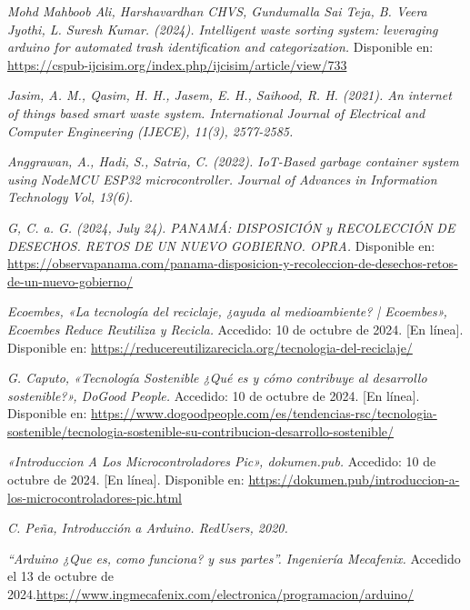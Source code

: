 \begin{thebibliography}{99}

    \textit{Mohd Mahboob Ali, Harshavardhan CHVS, Gundumalla Sai Teja, B. Veera Jyothi,  L. Suresh Kumar. (2024). Intelligent waste sorting system: leveraging arduino for automated trash identification and categorization.} Disponible en: \url{https://cspub-ijcisim.org/index.php/ijcisim/article/view/733}

    \textit{Jasim, A. M., Qasim, H. H., Jasem, E. H., Saihood, R. H. (2021). An internet of things based smart waste system. International Journal of Electrical and Computer Engineering (IJECE), 11(3), 2577-2585.}

    \textit{Anggrawan, A., Hadi, S., Satria, C. (2022). IoT-Based garbage container system using NodeMCU ESP32 microcontroller. Journal of Advances in Information Technology Vol, 13(6).}

    \textit{G, C. a. G. (2024, July 24). PANAMÁ: DISPOSICIÓN y RECOLECCIÓN DE DESECHOS. RETOS DE UN NUEVO GOBIERNO. OPRA. } Disponible en: \url{https://observapanama.com/panama-disposicion-y-recoleccion-de-desechos-retos-de-un-nuevo-gobierno/}

    \textit{Ecoembes, «La tecnología del reciclaje, ¿ayuda al medioambiente? | Ecoembes», Ecoembes Reduce Reutiliza y Recicla.} Accedido: 10 de octubre de 2024. [En línea]. Disponible en: \url{https://reducereutilizarecicla.org/tecnologia-del-reciclaje/}
    
    \textit{G. Caputo, «Tecnología Sostenible ¿Qué es y cómo contribuye al desarrollo sostenible?», DoGood People.} Accedido: 10 de octubre de 2024. [En línea]. Disponible en: \url{https://www.dogoodpeople.com/es/tendencias-rsc/tecnologia-sostenible/tecnologia-sostenible-su-contribucion-desarrollo-sostenible/}
    
    \textit{«Introduccion A Los Microcontroladores Pic», dokumen.pub.} Accedido: 10 de octubre de 2024. [En línea]. Disponible en: \url{https://dokumen.pub/introduccion-a-los-microcontroladores-pic.html}
    
    \textit{C. Peña, Introducción a Arduino. RedUsers, 2020.}

    \textit{“Arduino ¿Que es, como funciona? y sus partes”. Ingeniería Mecafenix.} Accedido el 13 de octubre de 2024.\url{https://www.ingmecafenix.com/electronica/programacion/arduino/}


\end{thebibliography}
